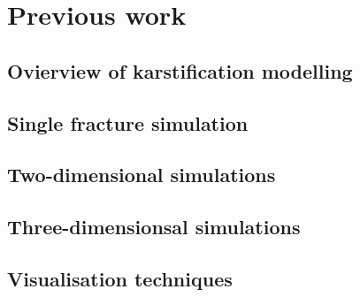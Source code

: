 \chapter{Previous work}
\section{Ovierview of karstification modelling}
\section{Single fracture simulation}
\section{Two-dimensional simulations}
\section{Three-dimensionsal simulations}
\section{Visualisation techniques}
